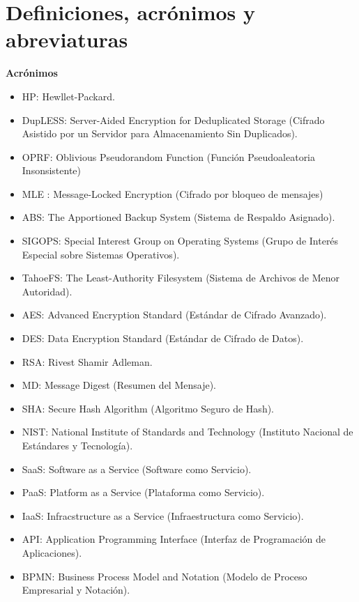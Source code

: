 \section{Definiciones, acrónimos y abreviaturas}

\textbf{Acrónimos}
\begin{itemize}
\item HP: Hewllet-Packard.
\item DupLESS: Server-Aided Encryption for Deduplicated Storage (Cifrado Asistido por un Servidor para Almacenamiento Sin Duplicados).
\item OPRF: Oblivious Pseudorandom Function (Función Pseudoaleatoria Insonsistente)
\item MLE : Message-Locked Encryption (Cifrado por bloqueo de mensajes)
\item ABS: The Apportioned Backup System (Sistema de Respaldo Asignado).
\item SIGOPS: Special Interest Group on Operating Systems (Grupo de Interés Especial sobre Sistemas Operativos).
\item TahoeFS: The Least-Authority Filesystem (Sistema de Archivos de Menor Autoridad).
\item AES: Advanced Encryption Standard (Estándar de Cifrado Avanzado).
\item DES: Data Encryption Standard (Estándar de Cifrado de Datos).
\item RSA: Rivest Shamir Adleman.
\item MD: Message Digest (Resumen del Mensaje).
\item SHA: Secure Hash Algorithm (Algoritmo Seguro de Hash).
\item NIST: National Institute of Standards and Technology (Instituto Nacional de Estándares y Tecnología).
\item SaaS: Software as a Service (Software como Servicio).
\item PaaS: Platform as a Service (Plataforma como Servicio).
\item IaaS: Infracstructure as a Service (Infraestructura como Servicio).
\item API: Application Programming Interface (Interfaz de Programación de Aplicaciones).
\item BPMN: Business Process Model and Notation (Modelo de Proceso Empresarial y Notación). 
\end{itemize}

